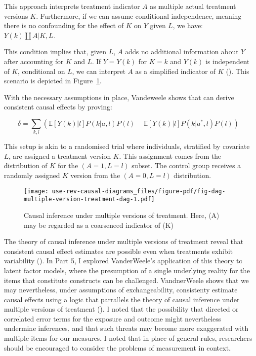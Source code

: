 \documentclass[
  singlecolumn,
  9pt]{article}
\begin{document}
This approach interprets treatment indicator \(A\) as multiple actual
treatment versions \(K\). Furthermore, if we can assume conditional
independence, meaning there is no confounding for the effect of \(K\) on
\(Y\) given \(L\), we have: \(Y(k)\coprod A|K,L\).

This condition implies that, given \(L\), \(A\) adds no additional
information about \(Y\) after accounting for \(K\) and \(L\). If
\(Y = Y(k)\) for \(K = k\) and \(Y(k)\) is independent of \(K\),
conditional on \(L\), we can interpret \(A\) as a simplified indicator
of \(K\) ().
This scenario is depicted in
Figure~\ref{fig-dag-multiple-version-treatment-dag}.

With the necessary assumptions in place, Vandeweele shows that can
derive consistent causal effects by proving:

\[\delta = \sum_{k,l} \left( \mathbb{E}[Y(k)|l] P(k|a,l) P(l) - \mathbb{E}[Y(k)|l] P(k|a^*,l) P(l) \right) \]

This setup is akin to a randomised trial where individuals, stratified
by covariate \(L\), are assigned a treatment version \(K\). This
assignment comes from the distribution of \(K\) for the
\((A = 1, L = l)\) subset. The control group receives a randomly
assigned \(K\) version from the \((A = 0, L = l)\) distribution.

\begin{figure}

{\centering \texttt{[image: use-rev-causal-diagrams\_files/figure-pdf/fig-dag-multiple-version-treatment-dag-1.pdf]}

}

\caption{\label{fig-dag-multiple-version-treatment-dag}Causal inference
under multiple versions of treatment. Here, (A) may be regarded as a
coarseneed indicator of (K)}

\end{figure}

The theory of causal inference under multiple versions of treatment
reveal that consistent causal effect estimates are possible even when
treatments exhibit variability
(). In Part
5, I explored VanderWeele's application of this theory to latent factor
models, where the presumption of a single underlying reality for the
items that constitute constructs can be challenged. VandnerWeele shows
that we may nevertheless, under assumptions of exchangeability,
consistenty estimate causal effects using a logic that parrallels the
theory of causal inference under multiple versions of treatment
(). I noted that the
possibility that directed or correlated error terms for the exposure and
outcome might nevertheless undermine inferences, and that such threats
may become more exaggerated with multiple items for our measures. I
noted that in place of general rules, researchers should be encouraged
to consider the problems of measurement in context.
\end{document}
